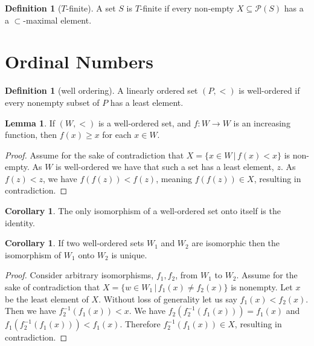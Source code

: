 \documentclass{article}
\theoremstyle{definition}
\newtheorem{crly}[thm]{Corollary}
\newtheorem{defn}[thm]{Definition}
\newtheorem{lmma}[thm]{Lemma}
\newcommand{\powset}[1]{\mathcal{P}(#1)}
\begin{document}
\begin{defn}[$T$-finite]
    A set $S$ is $T$-finite if every non-empty $X \subseteq \powset{S}$ has a a $\subset$-maximal element.
\end{defn}

\section{Ordinal Numbers}

\begin{defn}[well ordering]
    A linearly ordered set $(P, <)$ is well-ordered if every nonempty subset of $P$ has a least element.
\end{defn}

\begin{lmma}
    If $(W, <)$ is a well-ordered set, and $f: W \to W$ is an increasing function, then $f(x) \ge x$ for each $x \in W$.
\end{lmma}

\begin{proof}
    Assume for the sake of contradiction that $X = \{x \in W \, | \, f(x) < x\}$ is non-empty. As $W$ is well-ordered we have that such a set has a least element, $z$. As $f(z) < z$, we have $f(f(z)) < f(z)$, meaning $f(f(z)) \in X$, resulting in contradiction.
\end{proof}

\begin{crly}
    The only isomorphism of a well-ordered set onto itself is the identity.
\end{crly}

\begin{crly}
    If two well-ordered sets $W_1$ and $W_2$ are isomorphic then the isomorphism of $W_1$ onto $W_2$ is unique.
\end{crly}

\begin{proof}
    Consider arbitrary isomorphisms, $f_1, f_2$, from $W_1$ to $W_2$. Assume for the sake of contradiction that $X = \{w \in W_1 \, | \, f_1(x) \ne f_2(x) \}$ is nonempty. Let $x$ be the least element of $X$. Without loss of generality let us say $f_1(x) < f_2(x)$. Then we have $f_{2}^{-1}(f_1(x)) < x$. We have $f_{2}(f_{2}^{-1}(f_1(x))) = f_1(x)$ and $f_1(f_{2}^{-1}(f_1(x))) < f_1(x)$. Therefore $f_{2}^{-1}(f_1(x)) \in X$, resulting in contradiction. 
\end{proof}
\end{document}
